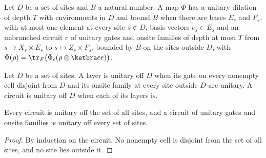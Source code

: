 \begin{definition}
    \label{def:protocols_unitary_dilation}
    \leanok
    Let $D$ be a set of sites and $B$ a natural number. A map $\Phi$ has a unitary dilation of
    depth $T$ with environments in $D$ and bound $B$ when there are bases $E_s$ and $F_s$, with at
    most one element at every site $s\notin D$, basis vectors $e_s\in E_s$ and an unbranched
    circuit $c$ of unitary gates and onsite families of depth at most $T$ from
    $s\mapsto X_s\times E_s$ to $s\mapsto Z_s\times F_s$, bounded by $B$ on the sites outside
    $D$, with $\Phi(\rho)=\tr_F\bigl(\Phi_c(\rho\otimes\ketbra ee)\bigr)$.
\end{definition}

\begin{definition}
    \label{def:protocols_unitary_off}
    \leanok
    Let $D$ be a set of sites. A layer is unitary off $D$ when its gate on every nonempty cell
    disjoint from $D$ and its onsite family at every site outside $D$ are unitary. A circuit is
    unitary off $D$ when each of its layers is.
\end{definition}

\begin{lemma}
    \label{lem:protocols_unitary_off}
    \leanok
    Every circuit is unitary off the set of all sites, and a circuit of unitary gates and
    onsite families is unitary off every set of sites.
\end{lemma}
\begin{proof}\leanok
    By induction on the circuit. No nonempty cell is disjoint from the set of all sites, and
    no site lies outside it.
\end{proof}

